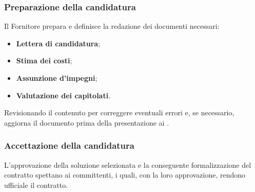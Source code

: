 \subsubsection{Preparazione della candidatura}
Il Fornitore prepara e definisce la redazione dei documenti necessari:
\begin{itemize}
    \item \textbf{Lettera di candidatura};
    \item \textbf{Stima dei costi};
    \item \textbf{Assunzione d’impegni};
    \item \textbf{Valutazione dei capitolati}.
\end{itemize}
Revisionando il contenuto per correggere eventuali errori e, se necessario, aggiorna il documento prima della presentazione ai .

\subsubsection{Accettazione della candidatura}
L'approvazione della soluzione selezionata e la conseguente formalizzazione del contratto spettano ai committenti, i quali, con la loro approvazione, rendono ufficiale il contratto.